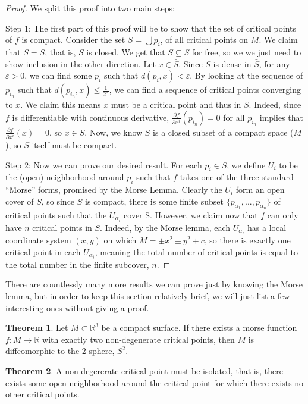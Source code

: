 \documentclass[12pt]{article}
\newcommand{\bR}{{\mathbb R}}
\theoremstyle{definition}
\newtheorem{theorem}{Theorem}
\begin{document}
\begin{proof}
	We split this proof into two main steps: 

	Step 1:
    The first part of this proof will be to show that the set of critical points of $f$ is compact. Consider the set $S = \bigcup p_i$, of all critical points on $M$. We claim that $\bar{S} = S$, that is, $S$ is closed. We get that $S\subseteq \bar{S}$ for free, so we we just need to show inclusion in the other direction. Let $x \in \bar{S}$. Since $S$ is dense in $\bar{S}$, for any $\varepsilon > 0$, we can find some $p_i$ such that $d(p_i,x)<\varepsilon$. By looking at the sequence of $p_{i_n}$ such that $d(p_{i_n},x)\leq \frac{1}{2^n}$, we can find a sequence of critical points converging to $x$. We claim this means $x$ must be a critical point and thus in $S$. Indeed, since $f$ is differentiable with continuous derivative, $\frac{\partial f}{\partial x^i}(p_{i_n}) = 0$ for all $p_{i_n}$ implies that $\frac{\partial f}{\partial x^i}(x) = 0$, so $x \in S$. Now, we know $S$ is a closed subset of a compact space ($M$), so $S$ itself must be compact. 
	
	Step 2:
	Now we can prove our desired result. For each $p_i \in S$, we define $U_i$ to be the (open) neighborhood around $p_i$ such that $f$ takes one of the three standard ``Morse'' forms, promised by the Morse Lemma. Clearly the $U_i$ form an open cover of $S$, so since $S$ is compact, there is some finite subset $\{p_{\alpha_1}, ... ,p_{\alpha_n}\}$ of critical points such that the $U_{\alpha_i}$ cover S. However, we claim now that $f$ can only have $n$ critical points in $S$. Indeed, by the Morse lemma, each $U_{\alpha_i}$ has a local coordinate system $(x,y)$ on which $M = \pm x^2 \pm y^2 +c$, so there is exactly one critical point in each $U_{\alpha_i}$, meaning the total number of critical points is equal to the total number in the finite subcover, $n$.
\end{proof}
\noindent
There are countlessly many more results we can prove just by knowing the Morse lemma, but in order to keep this section relatively brief, we will just list a few interesting ones without giving a proof. 

\begin{theorem}
	Let $M\subset \bR^3$ be a compact surface. If there exists a morse function $f:M\rightarrow \bR$ with exactly two non-degenerate critical points, then $M$ is diffeomorphic to the 2-sphere, $S^2$. 
\end{theorem}

\begin{theorem}
	A non-degererate critical point must be isolated, that is, there exists some open neighborhood around the critical point for which there exists no other critical points. 	
\end{theorem}
\end{document}
